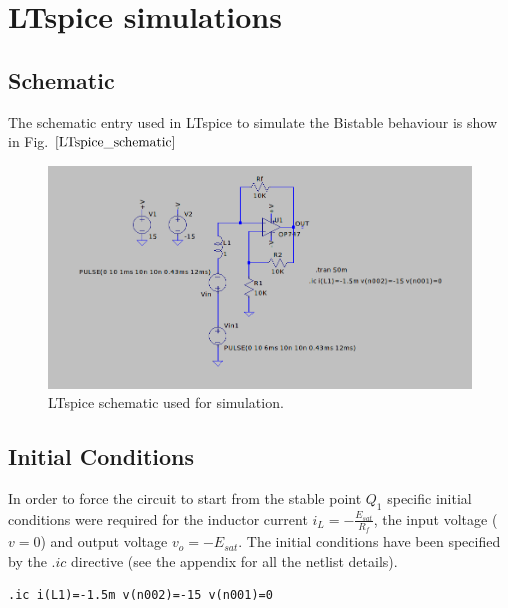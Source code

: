 \documentclass[12pt,a4paper,tweside,onehalfspacing]{article}
\begin{document}
\section{LTspice simulations}
\subsection{Schematic}
The schematic entry used in LTspice to simulate the Bistable behaviour is show in Fig. $\ref{LTspice_schematic}$
\begin{figure}[!ht]
        \centering \includegraphics[width=0.8\columnwidth]{bistable-schematic.png}
        \caption{\label{LTspice_schematic}LTspice schematic used for simulation.
        }
\end{figure}
%
\subsection{Initial Conditions}
In order to force the circuit to start from the stable point $Q_1$ specific initial conditions were required for the inductor current $i_L=-\frac{E_{sat}}{R_f}$, the input voltage ($v=0$) and output voltage $v_o=-E_{sat}$. The initial conditions have been specified by the $.ic$ directive (see the appendix for all the netlist details).
\begin{verbatim}
.ic i(L1)=-1.5m v(n002)=-15 v(n001)=0
\end{verbatim}
%
\end{document}
